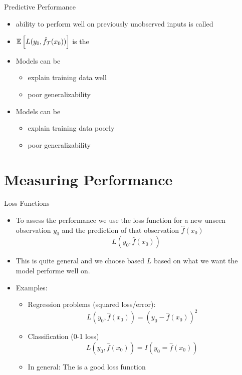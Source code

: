 \documentclass[10pt]{beamer}
\begin{document}
\begin{frame}{Predictive Performance}
\begin{itemize}
\item ability to perform well on previously unobserved inputs is called 
\item $\operatorname{\mathbb{E}}\left[L(y_0,\hat{f}_\mathcal{T}(x_0))\right]$ is the 
\pause
\item Models can be %
\begin{itemize}
\item explain training data well
\item poor generalizability
\end{itemize}
\pause
\item Models can be 
\begin{itemize}
\item explain training data poorly
\item poor generalizability
\end{itemize}
\end{itemize}

\end{frame}

\section{Measuring Performance}
\frame{\sectionpage}

\begin{frame}{Loss Functions}



\begin{itemize}

\item To assess the performance we use the loss function for a new unseen observation $y_0$ and the prediction of that observation $\hat{f}(x_0)$
\[
L(y_0,\hat{f}(x_0))
\]
\pause
\item This is quite general and we choose based $L$ based on what we want the model performe well on.\pause
\item Examples:
\begin{itemize}
\item Regression problems (squared loss/error):
\[
    L(y_0,\hat{f}(x_0)) = (y_0 - \hat{f}(x_0))^2
\]
\pause
\item Classification (0-1 loss)
\[
    L(y_0,\hat{f}(x_0)) = I(y_0 = \hat{f}(x_0))
\]
\pause
\item In general: The  is a good loss function
\end{itemize}


\end{itemize}

\end{frame}
\end{document}
